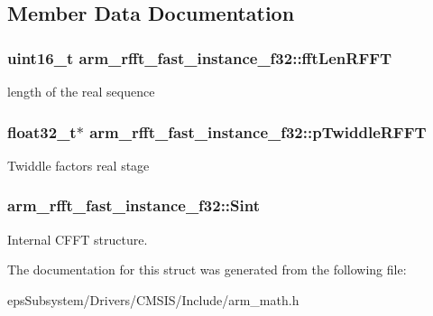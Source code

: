 \subsection{Member Data Documentation}
\hypertarget{structarm__rfft__fast__instance__f32_aef06ab665041ec36f5b25d464f0cab14}{
\subsubsection[{fft\-Len\-R\-F\-F\-T}]{\setlength{\rightskip}{0pt plus 5cm}uint16\-\_\-t arm\-\_\-rfft\-\_\-fast\-\_\-instance\-\_\-f32\-::fft\-Len\-R\-F\-F\-T}}\label{structarm__rfft__fast__instance__f32_aef06ab665041ec36f5b25d464f0cab14}
length of the real sequence \hypertarget{structarm__rfft__fast__instance__f32_a9f30b04f163fabc1b24421d3c323d5fc}{
\subsubsection[{p\-Twiddle\-R\-F\-F\-T}]{\setlength{\rightskip}{0pt plus 5cm}float32\-\_\-t$\ast$ arm\-\_\-rfft\-\_\-fast\-\_\-instance\-\_\-f32\-::p\-Twiddle\-R\-F\-F\-T}}\label{structarm__rfft__fast__instance__f32_a9f30b04f163fabc1b24421d3c323d5fc}
Twiddle factors real stage \hypertarget{structarm__rfft__fast__instance__f32_a37419ababdfb3151b1891ae6bcd21012}{
\subsubsection[{Sint}]{ arm\-\_\-rfft\-\_\-fast\-\_\-instance\-\_\-f32\-::\-Sint}}\label{structarm__rfft__fast__instance__f32_a37419ababdfb3151b1891ae6bcd21012}
Internal C\-F\-F\-T structure. 

The documentation for this struct was generated from the following file\-:\begin{DoxyCompactItemize}
\item 
eps\-Subsystem/\-Drivers/\-C\-M\-S\-I\-S/\-Include/arm\-\_\-math.\-h\end{DoxyCompactItemize}
